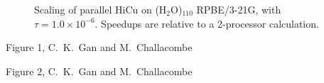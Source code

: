 \commentoutA{\documentclass[prl,aps,twocolumn,showpacs,twocolumngrid,superbib]{revtex4}}
\begin{document}
{\begin{figure}[h]
\caption{Scaling of parallel HiCu on (H$_2$O)$_{110}$ RPBE/3-21G, with
$\tau = 1.0 \times 10^{-6}$. Speedups are relative to a 2-processor
calculation.}\label{fig:waterscaling}
\end{figure}

\pagebreak
\pagebreak
\pagebreak

\begin{center}
Figure 1, C.~K.~Gan and M.~Challacombe \\[1.cm]
\end{center}

\pagebreak
\begin{center}
Figure 2, C.~K.~Gan and M.~Challacombe \\[1.cm]
\end{center}

}
\end{document}
